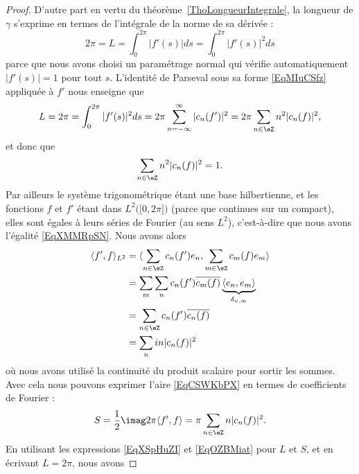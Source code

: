 \begin{proof}
	D'autre part en vertu du théorème~\ref{ThoLongueurIntegrale}, la longueur de \( \gamma\) s'exprime en termes de l'intégrale de la norme de sa dérivée :
	\begin{equation}
		2\pi=L=\int_0^{2\pi}| f'(s) |ds=\int_0^{2\pi}| f'(s) |^2ds
	\end{equation}
	parce que nous avons choisi un paramétrage normal qui vérifie automatiquement \( | f'(s) |=1\) pour tout \( s\). L'identité de Parseval sous sa forme \eqref{EqMIuCSfz} appliquée à \( f'\) nous enseigne que
	\begin{equation}        \label{EqXSpHuZI}
		L=2\pi=\int_0^{2\pi}| f'(s) |^2ds=2\pi\sum_{n=-\infty}^{\infty}| c_n(f') |^2=2\pi\sum_{n\in \eZ}n^2| c_n(f) |^2,
	\end{equation}
	et donc que
	\begin{equation}        \label{EQooAXAWooIgSDmu}
		\sum_{n\in \eZ}n^2| c_n(f) |^2=1.
	\end{equation}
	Par ailleurs le système trigonométrique étant une base hilbertienne, et les fonctions \( f\) et \( f'\) étant dans \( L^2\big( \mathopen[ 0 , 2\pi \mathclose] \big)\) (parce que continues sur un compact), elles sont égales à leurs séries de Fourier (au sens \( L^2\)), c'est-à-dire que nous avons l'égalité \eqref{EqXMMRpSN}. Nous avons alors
	\begin{subequations}
		\begin{align}
			\langle f', f\rangle_{L^2} & =\langle \sum_{n\in \eZ}c_n(f')e_n, \sum_{m\in \eZ}c_m(f)e_m\rangle                         \\
			                           & =\sum_m\sum_nc_n(f')\overline{ c_m(f) }\underbrace{\langle e_n, e_m\rangle }_{\delta_{n,m}} \\
			                           & =\sum_{n\in \eZ}c_n(f')\overline{ c_n(f) }                                                  \\
			                           & =\sum_nin| c_n(f) |^2
		\end{align}
	\end{subequations}
	où nous avons utilisé la continuité du produit scalaire pour sortir les sommes. Avec cela nous pouvons exprimer l'aire \eqref{EqCSWKbPX} en termes de coefficients de Fourier :
	\begin{equation}    \label{EqOZBMiat}
		S=\frac{ 1 }{2}\imag2\pi\langle f', f\rangle =\pi\sum_{n\in \eZ}n| c_n(f) |^2.
	\end{equation}
	En utilisant les expressions \eqref{EqXSpHuZI} et \eqref{EqOZBMiat} pour \( L\) et \( S\), et en écrivant \( L=2\pi \), nous avons

\end{proof}
